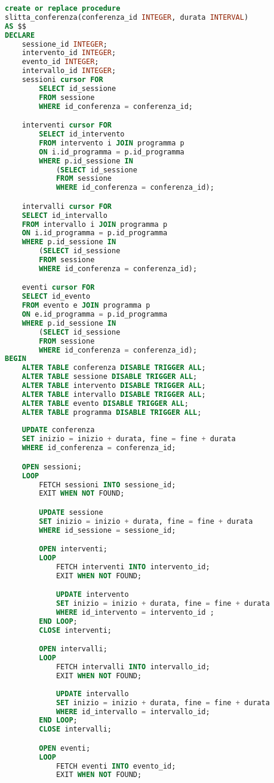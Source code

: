 \begin{lstlisting}[language=SQL,style=mystyle]
	create or replace procedure 
slitta_conferenza(conferenza_id INTEGER, durata INTERVAL)
AS $$
DECLARE
	sessione_id INTEGER;
	intervento_id INTEGER;
	evento_id INTEGER;
	intervallo_id INTEGER;
	sessioni cursor FOR 
		SELECT id_sessione 
		FROM sessione 
		WHERE id_conferenza = conferenza_id;

	interventi cursor FOR
		SELECT id_intervento 
		FROM intervento i JOIN programma p 
		ON i.id_programma = p.id_programma 
		WHERE p.id_sessione IN 
			(SELECT id_sessione 
			FROM sessione 
			WHERE id_conferenza = conferenza_id);

	intervalli cursor FOR
	SELECT id_intervallo 
	FROM intervallo i JOIN programma p 
	ON i.id_programma = p.id_programma 
	WHERE p.id_sessione IN 
		(SELECT id_sessione 
		FROM sessione 
		WHERE id_conferenza = conferenza_id);

	eventi cursor FOR
	SELECT id_evento 
	FROM evento e JOIN programma p 
	ON e.id_programma = p.id_programma 
	WHERE p.id_sessione IN 
		(SELECT id_sessione 
		FROM sessione 
		WHERE id_conferenza = conferenza_id);
BEGIN
	ALTER TABLE conferenza DISABLE TRIGGER ALL;
	ALTER TABLE sessione DISABLE TRIGGER ALL;
	ALTER TABLE intervento DISABLE TRIGGER ALL;
	ALTER TABLE intervallo DISABLE TRIGGER ALL;
	ALTER TABLE evento DISABLE TRIGGER ALL;
	ALTER TABLE programma DISABLE TRIGGER ALL;
	
	UPDATE conferenza
	SET inizio = inizio + durata, fine = fine + durata
	WHERE id_conferenza = conferenza_id;

	OPEN sessioni;
	LOOP
		FETCH sessioni INTO sessione_id;
		EXIT WHEN NOT FOUND;

		UPDATE sessione
		SET inizio = inizio + durata, fine = fine + durata
		WHERE id_sessione = sessione_id;

		OPEN interventi;
		LOOP
			FETCH interventi INTO intervento_id;
			EXIT WHEN NOT FOUND;

			UPDATE intervento
			SET inizio = inizio + durata, fine = fine + durata
			WHERE id_intervento = intervento_id ;
		END LOOP;
		CLOSE interventi;

		OPEN intervalli;
		LOOP
			FETCH intervalli INTO intervallo_id;
			EXIT WHEN NOT FOUND;
	
			UPDATE intervallo
			SET inizio = inizio + durata, fine = fine + durata
			WHERE id_intervallo = intervallo_id;
		END LOOP;
		CLOSE intervalli;

		OPEN eventi;
		LOOP
			FETCH eventi INTO evento_id;
			EXIT WHEN NOT FOUND;


\end{lstlisting}

